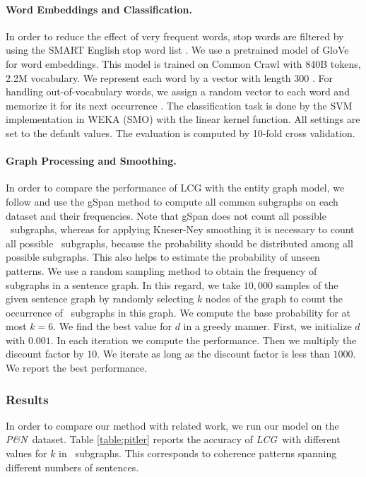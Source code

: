 \paragraph{Word Embeddings and Classification.} In order to reduce the
effect of very frequent words, stop words are filtered by using the
SMART English stop word list \cite{salton71}. We use a pre\-trained
model of GloVe for word embeddings. This model is trained on Common
Crawl with 840B tokens, 2.2M vocabulary. We represent each word by a
vector with length 300 \cite{pennington14}.  For handling
out-of-vocabulary words, we assign a random vector to each word and
memorize it for its next occurrence \cite{kusner15}. 
The classification task is done by the SVM implementation in WEKA (SMO)
with the linear kernel function. All settings are set to the default
values. The evaluation is computed by 10-fold cross validation.

\paragraph{Graph Processing and Smoothing.} In order to compare the
performance of LCG with the entity graph model, we follow
 and use the gSpan method \cite{yanxifeng02} to compute all common
subgraphs on each dataset and their frequencies. Note that gSpan
does not count all possible \knode\ subgraphs, whereas for applying
Kneser-Ney smoothing it is necessary to count all possible \knode\
subgraphs, because the probability should be distributed among all
possible subgraphs.  This also helps to estimate the probability of
unseen patterns. We use a random sampling method \cite{shervashidze09}
to obtain the frequency of subgraphs in a sentence graph. In this
regard, we take $10,000$ samples of the given sentence graph by
randomly selecting $k$ nodes of the graph to count the occurrence of
\knode\ subgraphs in this graph. We compute the base probability for
at most $k = 6$. We find the best value for $d$ in a greedy
manner. First, we initialize $d$ with $0.001$. In each iteration we
compute the performance. Then we multiply the discount factor by $10$. We
iterate as long as the discount factor is less than $1000$. We report
the best performance.

\subsubsection{Results}
In order to compare our method with related work, we run our model on
the \emph{P\&N}\ dataset. Table \ref{table:pitler} reports the accuracy
of \emph{LCG}\ with different values for $k$ in \knode\
subgraphs. This corresponds to coherence patterns spanning
different numbers of sentences.

